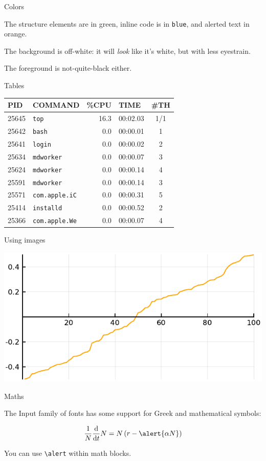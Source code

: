 \documentclass[12pt, compress, aspectratio=1610]{beamer}
\let\OldTexttt\texttt
\renewcommand{\texttt}[1]{\OldTexttt{\color{plTT}#1}}
\begin{document}
\begin{frame}[fragile]{Colors}

The structure elements are in green, inline code is in \texttt{blue},
and alerted text in \alert{orange}.

The background is off-white: it will \emph{look} like it's white, but
with less eyestrain.

The foreground is not-quite-black either.

\end{frame}

\begin{frame}[fragile]{Tables}

\begin{longtable}[]{@{}llrlc@{}}
\toprule
PID & COMMAND & \%CPU & TIME & \#TH\tabularnewline
\midrule
\endhead
25645 & \texttt{top} & 16.3 & 00:02.03 & 1/1\tabularnewline
25642 & \texttt{bash} & 0.0 & 00:00.01 & 1\tabularnewline
25641 & \texttt{login} & 0.0 & 00:00.02 & 2\tabularnewline
25634 & \texttt{mdworker} & 0.0 & 00:00.07 & 3\tabularnewline
25624 & \texttt{mdworker} & 0.0 & 00:00.14 & 4\tabularnewline
25591 & \texttt{mdworker} & 0.0 & 00:00.14 & 3\tabularnewline
25571 & \texttt{com.apple.iC} & 0.0 & 00:00.31 & 5\tabularnewline
25414 & \texttt{installd} & 0.0 & 00:00.52 & 2\tabularnewline
25366 & \texttt{com.apple.We} & 0.0 & 00:00.07 & 4\tabularnewline
\bottomrule
\end{longtable}

\end{frame}

\begin{frame}{Using images}

\includegraphics[width=\textwidth]{figures/density.pdf}

\end{frame}

\begin{frame}[fragile]{Maths}

The Input family of fonts has some support for Greek and mathematical
symbols:

\[
\frac{1}{N}\frac{\text{d}}{\text{d}t}N = N\left(r-\alert{\alpha N}\right)
\]

You can use \texttt{\textbackslash{}alert} within math blocks.

\end{frame}
\end{document}
